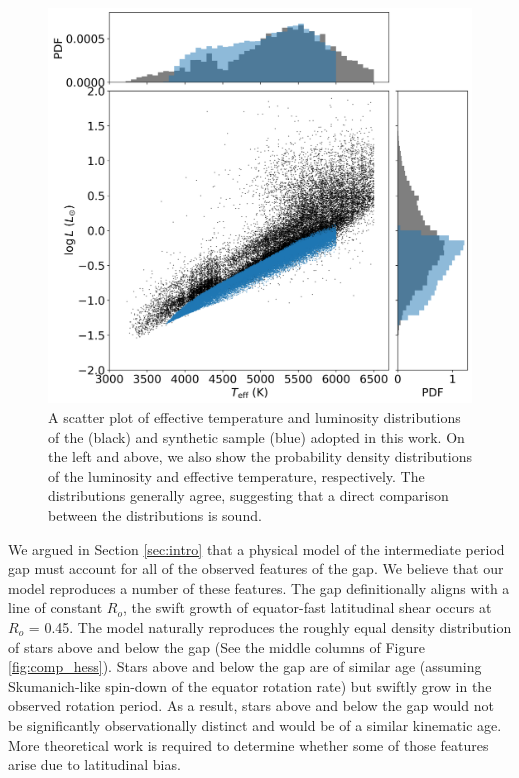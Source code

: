 \begin{figure}
\centering
 \includegraphics[width=\textwidth]{Figures/rot_gap_figures/compar_dist.png}
 \caption[A comparison between the effective temperature and luminosity distributions of the \citet{mcquillan_rotation_2014} and synthetic sample adopted in this work. ]{A scatter plot of effective temperature and luminosity distributions of the \citet{mcquillan_rotation_2014} (black) and synthetic sample (blue) adopted in this work. On the left and above, we also show the probability density distributions of the luminosity and effective temperature, respectively. The distributions generally agree, suggesting that a direct comparison between the distributions is sound.}
 \label{fig:compar_teff_logl}
\end{figure}

We argued in Section \ref{sec:intro} that a physical model of the intermediate period gap must account for all of the observed features of the gap.
We believe that our model reproduces a number of these features.
The gap definitionally aligns with a line of constant $R_o$, the swift growth of equator-fast latitudinal shear occurs at $R_o$ = 0.45.
The model naturally reproduces the roughly equal density distribution of stars above and below the gap (See the middle columns of Figure \ref{fig:comp_hess}).
Stars above and below the gap are of similar age (assuming Skumanich-like spin-down of the equator rotation rate) but swiftly grow in the observed rotation period.
 As a result, stars above and below the gap would not be significantly observationally distinct and would be of a similar kinematic age.
More theoretical work is required to determine whether some of those features arise due to latitudinal bias.

